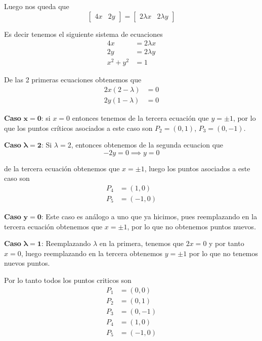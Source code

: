\documentclass[a4paper,oneside,10.5pt]{article}
\begin{document}
\begin{sol}
    Luego nos queda que
    \begin{equation*}
        \begin{bmatrix}
            4x & 2y
        \end{bmatrix} = \begin{bmatrix}
            2\lambda x & 2\lambda y
        \end{bmatrix}
    \end{equation*}

    Es decir tenemos el siguiente sistema de ecuaciones
    \begin{align*}
        4x &= 2\lambda x\\
        2y &= 2 \lambda y\\
        x^2 + y^2 &= 1
    \end{align*}

    De las 2 primeras ecuaciones obtenemos que
    \begin{align*}
        2x(2 - \lambda) &= 0\\
        2y(1 - \lambda) &= 0
    \end{align*}

    \textbf{Caso} $\mathbf{x = 0}$: si $x = 0$ entonces tenemos de la tercera ecuación que $y = \pm 1$, por lo que los puntos críticos asociados a este caso son $P_2 = (0, 1)$, $P_3 = (0, -1)$.

    \textbf{Caso} $\mathbf{\lambda = 2}$: Si $\lambda = 2$, entonces obtenemos de la segunda ecuacion que
    \begin{equation*}
        -2 y = 0 \implies y = 0
    \end{equation*}

    de la tercera ecuación obtenemos que $x = \pm 1$, luego los puntos asociados a este caso son
    \begin{align*}
        P_4 &= (1, 0)\\
        P_5 &= (-1, 0)
    \end{align*}

    \textbf{Caso} $\mathbf{y = 0}$: Este caso es análogo a uno que ya hicimos, pues reemplazando en la tercera ecuación obtenemos que $x = \pm1$, por lo que no obtenemos puntos nuevos.

    \textbf{Caso} $\mathbf{\lambda = 1}$: Reemplazando $\lambda$ en la primera, tenemos que $2x = 0$ y por tanto $x = 0$, luego reemplazando en la tercera obtenemos $y = \pm 1$ por lo que no tenemos nuevos puntos.

    Por lo tanto todos los puntos criticos son 
    \begin{align*}
        P_1 &= (0, 0)\\
        P_2 &= (0, 1)\\
        P_3 &= (0, -1)\\
        P_4 &= (1, 0)\\
        P_5 &= (-1, 0)
    \end{align*}


\end{sol}
\end{document}
